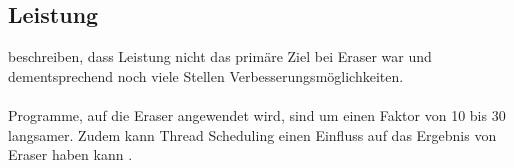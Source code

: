 \subsection*{Leistung}

\textcite[vgl.][400]{savage_eraser_nodate} beschreiben, dass Leistung nicht das primäre Ziel bei Eraser war und dementsprechend noch viele Stellen Verbesserungsmöglichkeiten.\\ 
\\
Programme, auf die Eraser angewendet wird, sind um einen Faktor von 10 bis 30 langsamer. Zudem kann Thread Scheduling einen Einfluss auf das Ergebnis von Eraser haben kann \cite[vgl.][400]{savage_eraser_nodate}.   



